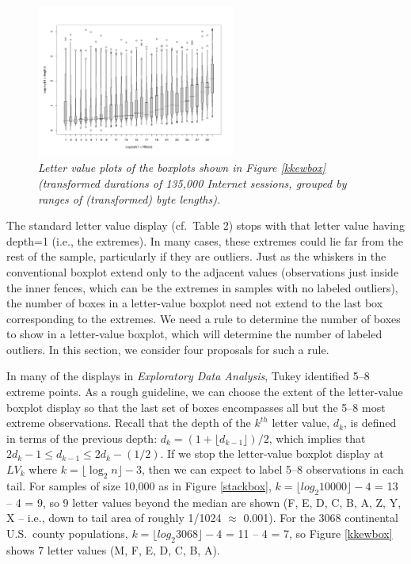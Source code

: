 \documentclass[11pt]{article}
\begin{document}
\clearpage

\begin{figure}[htbp]
  \begin{center}
\includegraphics[width=6.5cm,angle=270]{lvbox2}
\caption{\it \label{kkewlv} Letter value plots of the boxplots
shown in Figure \ref{kkewbox} (transformed durations of 135,000
Internet sessions, grouped by ranges of (transformed) byte lengths).}
  \end{center}
 \end{figure}


The standard letter value display (cf.~Table 2) stops with
that letter value having depth=1 (i.e., the extremes).
In many cases, these extremes could lie far from the
rest of the sample, particularly if they are outliers.
Just as the whiskers in the conventional boxplot 
extend only to the adjacent values (observations just
inside the inner fences, which can be the extremes
in samples with no labeled outliers), the number
of boxes in a letter-value boxplot need not
extend to the last box corresponding to the extremes.
We need a rule to determine the number of boxes to
show in a letter-value boxplot, which will determine
the number of labeled outliers.
In this section, we consider four proposals for
such a rule.

In many of the displays in \textit{Exploratory
Data Analysis}, Tukey identified 5--8 extreme points.
As a rough guideline, we can choose the extent
of the letter-value boxplot display so that
the last set of boxes encompasses all but
the 5--8 most extreme observations.
Recall that the depth of the $k^{th}$ letter value,
$d_k$, is defined in terms of the previous depth:
$d_k = (1 + \lfloor d_{k-1} \rfloor)/2$, which
implies that 
$2 d_{k} -1 \leq d_{k-1} \leq 2 d_k - (1/2)$.
If we stop the letter-value boxplot display at
$LV_k$ where $k = \lfloor \log_2 n \rfloor - 3$,
then we can expect to label 5--8 observations
in each tail.  For samples of size
10,000 as in Figure \ref{stackbox},
$k = \lfloor log_2 10000 \rfloor - 4$ = 13 -- 4 = 9,
so 9 letter values beyond the median are shown
(F, E, D, C, B, A, Z, Y, X -- i.e., down to
tail area of roughly 1/1024 $\approx$ 0.001).
For the 3068 continental U.S.~county populations,
$k = \lfloor log_2 3068 \rfloor - 4$ = 11 -- 4 = 7,
so Figure \ref{kkewbox} shows
7 letter values (M, F, E, D, C, B, A).
\end{document}
